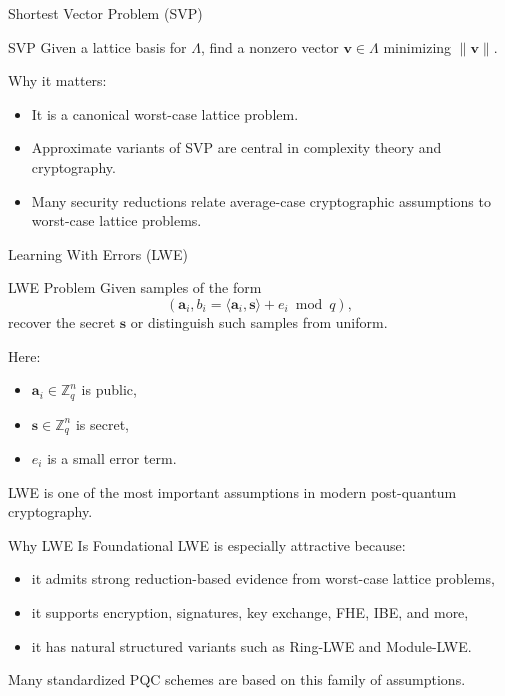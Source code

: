 \documentclass[aspectratio=169]{beamer}
\begin{document}
	\begin{frame}{Shortest Vector Problem (SVP)}
		\begin{block}{SVP}
			Given a lattice basis for $\Lambda$, find a nonzero vector $\bm{v} \in \Lambda$ minimizing $\|\bm{v}\|$.
		\end{block}
		
		\vspace{0.5em}
		Why it matters:
		\begin{itemize}
			\item It is a canonical worst-case lattice problem.
			\item Approximate variants of SVP are central in complexity theory and cryptography.
			\item Many security reductions relate average-case cryptographic assumptions to worst-case lattice problems.
		\end{itemize}
	\end{frame}
	
	\begin{frame}{Learning With Errors (LWE)}
		\begin{block}{LWE Problem}
			Given samples of the form
			\[
			(\bm{a}_i, b_i = \langle \bm{a}_i, \bm{s} \rangle + e_i \bmod q),
			\]
			recover the secret $\bm{s}$ or distinguish such samples from uniform.
		\end{block}
		
		\vspace{0.5em}
		Here:
		\begin{itemize}
			\item $\bm{a}_i \in \mathbb{Z}_q^n$ is public,
			\item $\bm{s} \in \mathbb{Z}_q^n$ is secret,
			\item $e_i$ is a small error term.
		\end{itemize}
		
		\vspace{0.5em}
		LWE is one of the most important assumptions in modern post-quantum cryptography.
	\end{frame}
	
	\begin{frame}{Why LWE Is Foundational}
		LWE is especially attractive because:
		\begin{itemize}
			\item it admits strong reduction-based evidence from worst-case lattice problems,
			\item it supports encryption, signatures, key exchange, FHE, IBE, and more,
			\item it has natural structured variants such as Ring-LWE and Module-LWE.
		\end{itemize}
		
		\vspace{0.5em}
		Many standardized PQC schemes are based on this family of assumptions.
	\end{frame}
	
\end{document}
